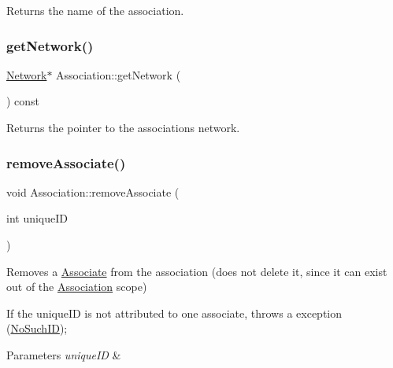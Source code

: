 Returns the name of the association. 

\mbox{\label{classAssociation_aa937fe1fcf8fb9f16a34ece38fef73d3}} 
\subsubsection{\texorpdfstring{get\+Network()}{getNetwork()}}
{\footnotesize\ttfamily \hyperlink{classNetwork}{Network}$\ast$ Association\+::get\+Network (\begin{DoxyParamCaption}{ }\end{DoxyParamCaption}) const}



Returns the pointer to the association\textquotesingle{}s network. 

\mbox{\label{classAssociation_ab0f1b461051c5a7844e6ce490b7caea1}} 
\subsubsection{\texorpdfstring{remove\+Associate()}{removeAssociate()}}
{\footnotesize\ttfamily void Association\+::remove\+Associate (\begin{DoxyParamCaption}\item[{int}]{unique\+ID }\end{DoxyParamCaption})}



Removes a \hyperlink{classAssociate}{Associate} from the association (does not delete it, since it can exist out of the \hyperlink{classAssociation}{Association} scope) 

If the unique\+ID is not attributed to one associate, throws a exception (\hyperlink{classNoSuchID}{No\+Such\+ID}); 
\begin{DoxyParams}{Parameters}
{\em unique\+ID} & \\
\hline
\end{DoxyParams}
\mbox{\label{classAssociation_a6d9cb24e51d87063ce0235c9ecd56866}} 
